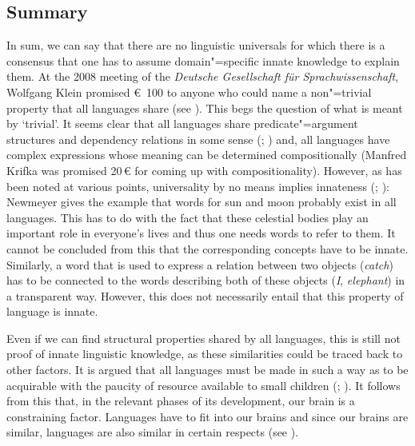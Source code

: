\subsection{Summary}
\label{Abschnitt-Universalien-Zusammenfassung}

In sum, we can say that there are no linguistic universals for which there is a consensus that one
has to assume domain"=specific innate knowledge to explain them.  At the 2008 meeting of the
\emph{Deutsche Gesellschaft für Sprachwissenschaft}, Wolfgang Klein
promised \euro~100 to anyone who could name a non"=trivial property that all languages share
(see \citealp{Klein2009a}). This begs the question of what is meant by `trivial'. It seems clear
that all languages share predicate"=argument structures and
dependency relations in some sense (\citealp[]{Hudson2010a}; \citealp[]{LR2010a}) and, all languages have complex expressions whose meaning can be determined
compositionally (Manfred Krifka was promised
20\,\euro{} for coming up with compositionality). However, as has been noted at various
points, universality by no means implies innateness (\citealp[]{Bates84a};
\citealp[]{Newmeyer2005a}): Newmeyer gives the example that words for sun and moon probably
exist in all languages. This has to do with the fact that these celestial bodies play an important
role in everyone's lives and thus one needs words to refer to them.  It cannot be concluded from
this that the corresponding concepts have to be innate. Similarly, a word that is used to express a
relation between two objects (\eg \emph{catch}) has to be connected to the words describing both of
these objects (\emph{I}, \emph{elephant}) in a transparent way. However, this does not necessarily entail that this property of language is innate.

Even if we can find structural properties shared by all languages, this is still not proof of innate linguistic knowledge, as these similarities could
be traced back to other factors. It is argued that all languages must be made in such a way as to be acquirable with the paucity of resource available to small
children (\citealp[Section~10.7.2]{Hurford2002a}; \citealp[]{Behrens2009a}).
It follows from this that, in the relevant phases of its development, our brain is a constraining factor.
Languages have to fit into our brains and since our brains are similar, languages are also similar
in certain respects (see \citealp[]{Kluender92a}).

